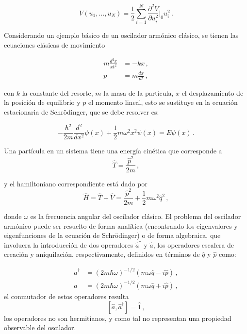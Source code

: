 \begin{equation*}
  V(u_1, \dots, u_N) = \frac{1}{2} \sum_{i=1}^{N} \frac{\partial^2 V}{\partial u_i^{2}}\Big|_0 u_i^2\,.
\end{equation*}

Considerando un ejemplo básico de un oscilador armónico clásico, se tienen las ecuaciones clásicas de movimiento

\begin{align}
  m \frac{d^2x}{xt^2} & = -kx \,, \label{OA.2}           \\
  p                   & = m\frac{dx}{dt} \,, \label{OA.3}
\end{align}

con $k$ la constante del resorte, $m$ la masa de la partícula, $x$ el desplazamiento de la posición de equilibrio y $p$ el momento lineal, esto se sustituye en la ecuación estacionaria de Schrödinger, que se debe resolver es:

\begin{equation}
\label{OA.4}  
-\frac{\hbar^2}{2m}\frac{d^2}{dx^2}\psi(x) + \frac{1}{2}m \omega^2 x^2 \psi(x) = E \psi(x) \,.
\end{equation}

Una partícula en un sistema tiene una energía cinética que corresponde a
\begin{equation*}
\hat{T} = \frac{\hat{p}^2}{2m}\,,
\end{equation*}

y el hamiltoniano correspondiente está dado por
\begin{equation}
  \hat{H} = \hat{T} + \hat{V} = \frac{\hat{p}^2}{2m} +\frac{1}{2} m\omega^2 \hat{q}^2 \label{OA.5}\,,
\end{equation}


donde $\omega$ es la frecuencia angular del oscilador clásico.
El problema del oscilador armónico puede ser resuelto de forma analítica (encontrando los eigenvalores y eigenfunciones de la ecuación de Schrödinger) o de forma algebraica, que involucra la introducción de dos operadores $\hat{a}^{\dagger}$ y $\hat{a}$, los operadores escalera de creación y aniquilación, respectivamente, definidos en términos de $\hat{q}$ y $\hat{p}$ como:

\begin{align}
\hat{a}^{\dagger} & = (2m\hbar\omega)^{-1/2}(m\omega \hat{q} - i\hat{p})\label{OA.6} \,,  \\
\hat{a} & = (2m\hbar \omega)^{-1/2}(m\omega \hat{q} + i \hat{p})\label{OA.7} \,,
\end{align}
el conmutador de estos operadores resulta
\begin{equation}
\label{OA.8}	
[\hat{a}, \hat{a}^{\dagger}] = \hat{1} \,,
\end{equation}
los operadores no son hermitianos, y como tal no representan una propiedad observable del oscilador. %

